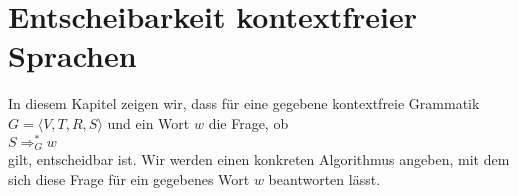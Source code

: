 \chapter{Entscheibarkeit kontextfreier Sprachen}
In diesem Kapitel zeigen wir, dass f\"ur eine gegebene kontextfreie Grammatik $G = \langle V, T, R, S \rangle$
und ein Wort $w$ die Frage, ob 
\\[0.2cm]
\hspace*{1.3cm}
$S \Rightarrow_G^* w$
\\[0.2cm]
gilt, entscheidbar ist.   Wir werden einen konkreten Algorithmus angeben, mit dem sich
diese Frage f\"ur ein gegebenes Wort $w$ beantworten l\"asst. 

